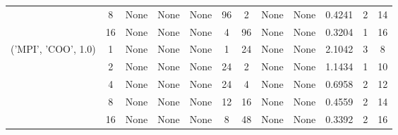 \begin{tabular}{cccccccccccc}
& 8& None& None& None& 96& 2& None& None& 0.4241& 2& 14\\
& 16& None& None& None& 4& 96& None& None& 0.3204& 1& 16\\
\hline
\multirow{5}{*}{('MPI', 'COO', 1.0)}& 1& None& None& None& 1& 24& None& None& 2.1042& 3& 8\\
& 2& None& None& None& 24& 2& None& None& 1.1434& 1& 10\\
& 4& None& None& None& 24& 4& None& None& 0.6958& 2& 12\\
& 8& None& None& None& 12& 16& None& None& 0.4559& 2& 14\\
& 16& None& None& None& 8& 48& None& None& 0.3392& 2& 16\\
\hline
\end{tabular}



